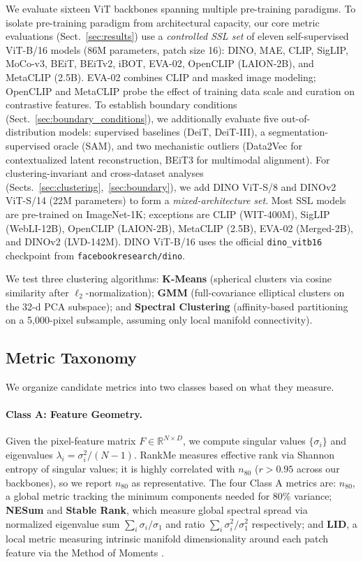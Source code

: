 \documentclass[runningheads]{llncs}
\begin{document}
We evaluate sixteen ViT backbones spanning multiple pre-training paradigms. To isolate pre-training paradigm from architectural capacity, our core metric evaluations (Sect.~\ref{sec:results}) use a \emph{controlled SSL set} of eleven self-supervised ViT-B/16 models (86M parameters, patch size 16): DINO, MAE, CLIP, SigLIP, MoCo-v3, BEiT, BEiTv2, iBOT, EVA-02, OpenCLIP (LAION-2B), and MetaCLIP (2.5B). EVA-02 combines CLIP and masked image modeling; OpenCLIP and MetaCLIP probe the effect of training data scale and curation on contrastive features. To establish boundary conditions (Sect.~\ref{sec:boundary_conditions}), we additionally evaluate five out-of-distribution models: supervised baselines (DeiT, DeiT-III), a segmentation-supervised oracle (SAM), and two mechanistic outliers (Data2Vec for contextualized latent reconstruction, BEiT3 for multimodal alignment). For clustering-invariant and cross-dataset analyses (Sects.~\ref{sec:clustering},~\ref{sec:boundary}), we add DINO ViT-S/8 and DINOv2 ViT-S/14 (22M parameters) to form a \emph{mixed-architecture set}. Most SSL models are pre-trained on ImageNet-1K; exceptions are CLIP (WIT-400M), SigLIP (WebLI-12B), OpenCLIP (LAION-2B), MetaCLIP (2.5B), EVA-02 (Merged-2B), and DINOv2 (LVD-142M). DINO ViT-B/16 uses the official \texttt{dino\_vitb16} checkpoint from \texttt{facebookresearch/dino}.

We test three clustering algorithms: \textbf{K-Means} (spherical clusters via cosine similarity after $\ell_2$-normalization); \textbf{GMM} (full-covariance elliptical clusters on the 32-d PCA subspace); and \textbf{Spectral Clustering} (affinity-based partitioning on a 5{,}000-pixel subsample, assuming only local manifold connectivity).

\subsection{Metric Taxonomy}
\label{sec:metric_taxonomy}

We organize candidate metrics into two classes based on what they measure.

\paragraph{Class A: Feature Geometry.} Given the pixel-feature matrix $F \in \mathbb{R}^{N \times D}$, we compute singular values $\{\sigma_i\}$ and eigenvalues $\lambda_i = \sigma_i^2 / (N-1)$. RankMe \cite{garrido2023} measures effective rank via Shannon entropy of singular values; it is highly correlated with $n_{80}$ ($r > 0.95$ across our backbones), so we report $n_{80}$ as representative. The four Class A metrics are: \textbf{$n_{80}$}, a global metric tracking the minimum components needed for 80\% variance; \textbf{NESum} and \textbf{Stable Rank}, which measure global spectral spread via normalized eigenvalue sum $\sum_i \sigma_i / \sigma_1$ and ratio $\sum_i \sigma_i^2 / \sigma_1^2$ respectively; and \textbf{LID}, a local metric measuring intrinsic manifold dimensionality around each patch feature via the Method of Moments \cite{amsaleg2018lid}.
\end{document}
